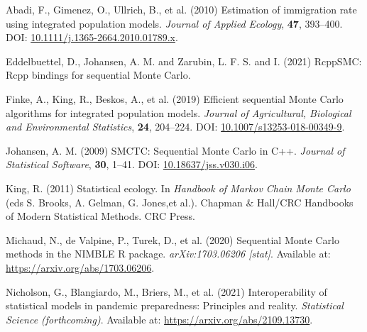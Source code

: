 \documentclass[
  10pt,
  a4paper,
]{article}
\newlength{\cslhangindent}
\newlength{\cslentryspacingunit} %
\newenvironment{CSLReferences}[2] %
 {%
  \setlength{\parindent}{0pt}
  \ifodd #1
  \let\oldpar\par
  \def\par{\hangindent=\cslhangindent\oldpar}
  \fi
  \setlength{\parskip}{#2\cslentryspacingunit}
 }%
 {}
\begin{document}
\hypertarget{refs}{}
\begin{CSLReferences}{1}{0}
\leavevmode{}%
Abadi, F., Gimenez, O., Ullrich, B., et al. (2010) Estimation of
immigration rate using integrated population models. \emph{Journal of
Applied Ecology}, \textbf{47}, 393--400. DOI:
\href{https://doi.org/10.1111/j.1365-2664.2010.01789.x}{10.1111/j.1365-2664.2010.01789.x}.

\leavevmode{}%
Eddelbuettel, D., Johansen, A. M. and Zarubin, L. F. S. and I. (2021)
{RcppSMC}: {Rcpp} bindings for sequential {Monte Carlo}.

\leavevmode{}%
Finke, A., King, R., Beskos, A., et al. (2019) Efficient sequential
{Monte Carlo} algorithms for integrated population models. \emph{Journal
of Agricultural, Biological and Environmental Statistics}, \textbf{24},
204--224. DOI:
\href{https://doi.org/10.1007/s13253-018-00349-9}{10.1007/s13253-018-00349-9}.

\leavevmode{}%
Johansen, A. M. (2009) {SMCTC}: {Sequential Monte Carlo} in {C}++.
\emph{Journal of Statistical Software}, \textbf{30}, 1--41. DOI:
\href{https://doi.org/10.18637/jss.v030.i06}{10.18637/jss.v030.i06}.

\leavevmode{}%
King, R. (2011) Statistical ecology. In \emph{Handbook of {Markov Chain
Monte Carlo}} (eds S. Brooks, A. Gelman, G. Jones,et al.). Chapman
{\(\&\)} {Hall}/{CRC Handbooks} of {Modern Statistical Methods}. {CRC
Press}.

\leavevmode{}%
Michaud, N., de Valpine, P., Turek, D., et al. (2020) Sequential {Monte
Carlo} methods in the {NIMBLE R} package. \emph{arXiv:1703.06206
{[}stat{]}}. Available at: \url{https://arxiv.org/abs/1703.06206}.

\leavevmode{}%
Nicholson, G., Blangiardo, M., Briers, M., et al. (2021)
Interoperability of statistical models in pandemic preparedness:
Principles and reality. \emph{Statistical Science (forthcoming)}.
Available at: \url{https://arxiv.org/abs/2109.13730}.

\end{CSLReferences}
\end{document}
